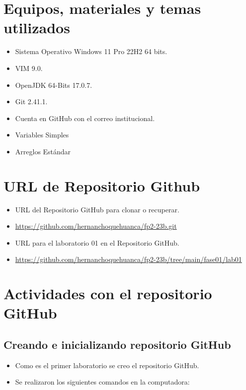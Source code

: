 \documentclass{article}
\begin{document}
	\section{Equipos, materiales y temas utilizados}
	\begin{itemize}
		\item Sistema Operativo Windows 11 Pro 22H2 64 bits.
		\item VIM 9.0.
		\item OpenJDK 64-Bits 17.0.7.
		\item Git 2.41.1.
		\item Cuenta en GitHub con el correo institucional.
        \item Variables Simples
		\item Arreglos Estándar
	\end{itemize}
	
	\section{URL de Repositorio Github}
	\begin{itemize}
		\item URL del Repositorio GitHub para clonar o recuperar.
        \item \url{https://github.com/hernanchoquehuanca/fp2-23b.git}
		\item URL para el laboratorio 01 en el Repositorio GitHub.
		\item \url{https://github.com/hernanchoquehuanca/fp2-23b/tree/main/fase01/lab01}
	\end{itemize}
	
	\section{Actividades con el repositorio GitHub}
	
	\subsection{Creando e inicializando repositorio GitHub}
	\begin{itemize}	
		\item Como es el primer laboratorio se creo el repositorio GitHub.
		\item Se realizaron los siguientes comandos en la computadora:
	\end{itemize}	
		
\end{document}
